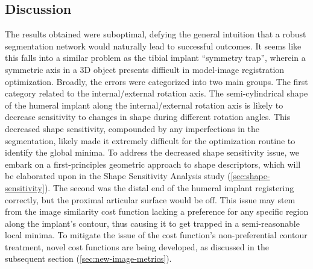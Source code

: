 \subsection{Discussion}
The results obtained were suboptimal, defying the general intuition that a robust segmentation network would naturally lead to successful outcomes.
It seems like this falls into a similar problem as the tibial implant ``symmetry trap'', wherein a symmetric axis in a 3D object presents difficult in model-image registration optimization.
Broadly, the errors were categorized into two main groups.
The first category related to the internal/external rotation axis.
The semi-cylindrical shape of the humeral implant along the internal/external rotation axis is likely to decrease sensitivity to changes in shape during different rotation angles.
This decreased shape sensitivity, compounded by any imperfections in the segmentation, likely made it extremely difficult for the optimization routine to identify the global minima.
To address the decreased shape sensitivity issue, we embark on a first-principles geometric approach to shape descriptors, which will be elaborated upon in the Shape Sensitivity Analysis study (\cref{sec:shape-sensitivity}).
The second was the distal end of the humeral implant registering correctly, but the proximal articular surface would be off.
This issue may stem from the image similarity cost function lacking a preference for any specific region along the implant's contour, thus causing it to get trapped in a semi-reasonable local minima.
To mitigate the issue of the cost function's non-preferential contour treatment, novel cost functions are being developed, as discussed in the subsequent section (\cref{sec:new-image-metrics}).


